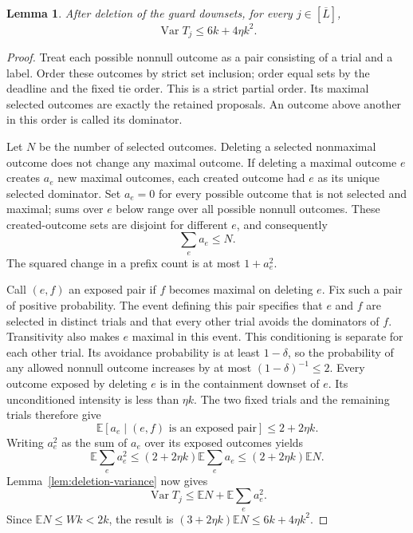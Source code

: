 \documentclass[11pt]{article}
\numberwithin{equation}{section}
\newtheorem{lemma}[theorem]{Lemma}
\theoremstyle{definition}
\newcommand{\E}{\mathbb E}
\newcommand{\Var}{\operatorname{Var}}
\newcommand{\cL}{\overline L}
\begin{document}
\begin{lemma}\label{lem:count-variance}
After deletion of the guard downsets, for every $j\in[\cL]$,
\begin{equation}\label{eq:count-variance}
 \Var T_j\le6k+4\eta k^2.
\end{equation}
\end{lemma}
\begin{proof}
Treat each possible nonnull outcome as a pair consisting of a trial and
a label. Order these outcomes by strict set inclusion; order equal sets
by the deadline and the fixed tie order. This is a strict partial order.
Its maximal selected outcomes are exactly the retained proposals.
An outcome above another in this order is called its dominator.

Let $N$ be the number of selected outcomes. Deleting a selected
nonmaximal outcome does not change any maximal outcome. If deleting a
maximal outcome $e$ creates $a_e$ new maximal outcomes, each created
outcome had $e$ as its unique selected dominator. Set $a_e=0$ for every
possible outcome that is not selected and maximal; sums over $e$ below
range over all possible nonnull outcomes. These created-outcome
sets are disjoint for different $e$, and consequently
\begin{equation}\label{eq:exposure-disjoint}
 \sum_e a_e\le N.
\end{equation}
The squared change in a prefix count is at most $1+a_e^2$.

Call $(e,f)$ an exposed pair if $f$ becomes maximal on deleting $e$.
Fix such a pair of positive probability.
The event defining this pair specifies that $e$ and $f$ are selected in
distinct trials and that every other trial avoids the dominators of
$f$. Transitivity also makes $e$ maximal in this event.
This conditioning is separate for each other trial. Its avoidance
probability is at least $1-\delta$, so the probability of any allowed
nonnull outcome increases by at most $(1-\delta)^{-1}\le2$.
Every outcome exposed by deleting $e$ is in the containment downset of
$e$. Its unconditioned intensity is less than $\eta k$.
The two fixed trials and the remaining trials therefore give
\[
 \E[a_e\mid(e,f)\text{ is an exposed pair}]\le2+2\eta k.
\]
Writing $a_e^2$ as the sum of $a_e$ over its exposed outcomes yields
\[
 \E\sum_ea_e^2\le(2+2\eta k)\E\sum_ea_e
                    \le(2+2\eta k)\E N.
\]
Lemma~\ref{lem:deletion-variance} now gives
\[
 \Var T_j\le\E N+\E\sum_e a_e^2.
\]
Since
$\E N\le Wk<2k$, the result is
$(3+2\eta k)\E N\le6k+4\eta k^2$.
\end{proof}
\end{document}
